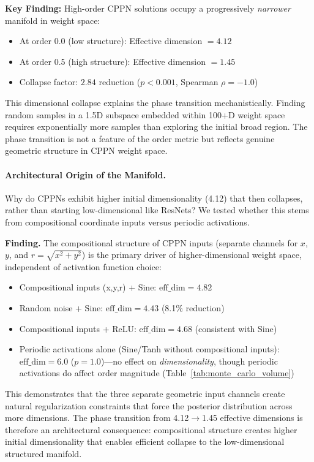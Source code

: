 \documentclass{article}
\begin{document}
\textbf{Key Finding:} High-order CPPN solutions occupy a progressively \emph{narrower} manifold in weight space:
\begin{itemize}
    \item At order 0.0 (low structure): Effective dimension $= 4.12$
    \item At order 0.5 (high structure): Effective dimension $= 1.45$
    \item Collapse factor: $2.84$ reduction ($p < 0.001$, Spearman $\rho = -1.0$)
\end{itemize}

This dimensional collapse explains the phase transition mechanistically. Finding random samples in a 1.5D subspace embedded within 100+D weight space requires exponentially more samples than exploring the initial broad region. The phase transition is not a feature of the order metric but reflects genuine geometric structure in CPPN weight space.

\paragraph{Architectural Origin of the Manifold.} Why do CPPNs exhibit higher initial dimensionality (4.12) that then collapses, rather than starting low-dimensional like ResNets? We tested whether this stems from compositional coordinate inputs versus periodic activations.

\textbf{Finding.} The compositional structure of CPPN inputs (separate channels for $x$, $y$, and $r = \sqrt{x^2 + y^2}$) is the primary driver of higher-dimensional weight space, independent of activation function choice:
\begin{itemize}
    \item Compositional inputs (x,y,r) + Sine: $\text{eff\_dim} = 4.82$
    \item Random noise + Sine: $\text{eff\_dim} = 4.43$ (8.1\% reduction)
    \item Compositional inputs + ReLU: $\text{eff\_dim} = 4.68$ (consistent with Sine)
    \item Periodic activations alone (Sine/Tanh without compositional inputs): $\text{eff\_dim} = 6.0$ ($p=1.0$)---no effect on \emph{dimensionality}, though periodic activations do affect order magnitude (Table~\ref{tab:monte_carlo_volume})
\end{itemize}

This demonstrates that the three separate geometric input channels create natural regularization constraints that force the posterior distribution across more dimensions. The phase transition from 4.12$\to$1.45 effective dimensions is therefore an architectural consequence: compositional structure creates higher initial dimensionality that enables efficient collapse to the low-dimensional structured manifold.
\end{document}
